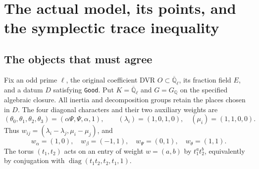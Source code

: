 \section{The actual model, its points, and the symplectic trace inequality}
\label{sec:symplectic-model-comparison}


\subsection{The objects that must agree}

Fix an odd prime $\ell$, the original coefficient DVR
$O\subset\overline{\mathbb Q}_\ell$, its fraction field $E$,
and a datum $D$ satisfying \texttt{Good}.  Put
$K=\overline{\mathbb Q}_\ell$ and $G=G_{\mathbb Q}$ on the
specified algebraic closure.  All inertia and decomposition
groups retain the places chosen in $D$.  The four diagonal
characters and their two auxiliary weights are
\[
 (\theta_0,\theta_1,\theta_2,\theta_3)
       =(\alpha\Psi,\Psi,\alpha,1),\qquad
 (\lambda_i)=(1,0,1,0),\quad(\mu_i)=(1,1,0,0).
 \tag{PX.1}
\]
Thus $w_{ij}=(\lambda_i-\lambda_j,\mu_i-\mu_j)$, and
\[
 w_\alpha=(1,0),\quad w_\beta=(-1,1),\quad
 w_\Psi=(0,1),\quad w_\theta=(1,1).
 \tag{PX.2}
\]
The torus $(t_1,t_2)$ acts on an entry of weight $w=(a,b)$
by $t_1^at_2^b$, equivalently by conjugation with
$\operatorname{diag}(t_1t_2,t_2,t_1,1)$.

